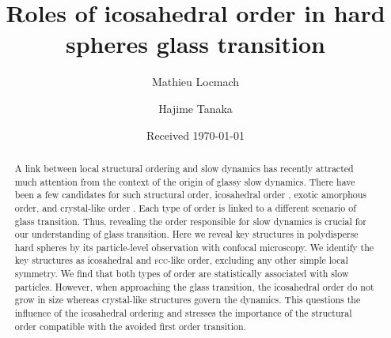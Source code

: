


\title{Roles of icosahedral order in hard spheres glass transition} 


\author{Mathieu Locmach} 

\author{Hajime Tanaka}

\date{Received \today}

\begin{abstract}
A link between local structural ordering and slow dynamics has recently attracted much attention from the context of the origin of glassy slow dynamics. There have been a few candidates for such structural order, icosahedral order \cite{steinhardt1983boo,tarjus2005fba}, exotic amorphous order, and crystal-like order \cite{tanaka2010critical}. Each type of order is linked to a different scenario of glass transition. Thus, revealing the order responsible for slow dynamics is crucial for our understanding of glass transition. Here we reveal key structures in polydisperse hard spheres by its particle-level observation with confocal microscopy. We identify the key structures as icosahedral and \textsc{fcc}-like order, excluding any other simple local symmetry. We find that both types of order are statistically associated with slow particles. However, when approaching the glass transition, the icosahedral order do not grow in size whereas crystal-like structures govern the dynamics. This questions the influence of the icosahedral ordering and stresses the importance of the structural order compatible with the avoided first order transition.
\end{abstract}
\maketitle



